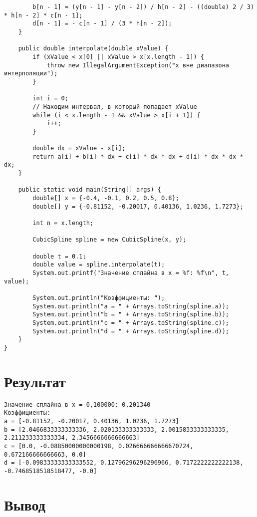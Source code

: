 \begin{verbatim}
        b[n - 1] = (y[n - 1] - y[n - 2]) / h[n - 2] - ((double) 2 / 3) * h[n - 2] * c[n - 1];
        d[n - 1] = - c[n - 1] / (3 * h[n - 2]);
    }

    public double interpolate(double xValue) {
        if (xValue < x[0] || xValue > x[x.length - 1]) {
            throw new IllegalArgumentException("x вне диапазона интерполяции");
        }

        int i = 0;
        // Находим интервал, в который попадает xValue
        while (i < x.length - 1 && xValue > x[i + 1]) {
            i++;
        }

        double dx = xValue - x[i];
        return a[i] + b[i] * dx + c[i] * dx * dx + d[i] * dx * dx * dx;
    }

    public static void main(String[] args) {
        double[] x = {-0.4, -0.1, 0.2, 0.5, 0.8};
        double[] y = {-0.81152, -0.20017, 0.40136, 1.0236, 1.7273};

        int n = x.length;

        CubicSpline spline = new CubicSpline(x, y);

        double t = 0.1;
        double value = spline.interpolate(t);
        System.out.printf("Значение сплайна в x = %f: %f\n", t, value);

        System.out.println("Коэффициенты: ");
        System.out.println("a = " + Arrays.toString(spline.a));
        System.out.println("b = " + Arrays.toString(spline.b));
        System.out.println("c = " + Arrays.toString(spline.c));
        System.out.println("d = " + Arrays.toString(spline.d));
    }
}
\end{verbatim}

\section*{Результат}

\begin{verbatim}
Значение сплайна в x = 0,100000: 0,201340
Коэффициенты: 
a = [-0.81152, -0.20017, 0.40136, 1.0236, 1.7273]
b = [2.0466833333333336, 2.020133333333333, 2.0015833333333335, 2.211233333333334, 2.3456666666666663]
c = [0.0, -0.08850000000000198, 0.026666666666670724, 0.672166666666663, 0.0]
d = [-0.09833333333333552, 0.12796296296296966, 0.7172222222222138, -0.7468518518518477, -0.0]
\end{verbatim}

\section*{Вывод}

